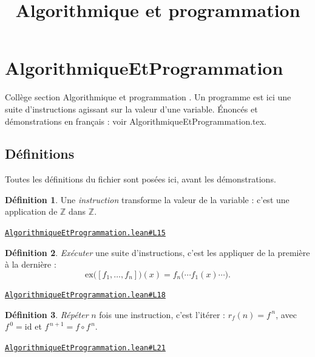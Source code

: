 \documentclass[11pt,a4paper]{article}
\title{Algorithmique et programmation}
\date{}
\theoremstyle{definition}
\newtheorem{definition}{Définition}
\theoremstyle{plain}
\newcommand{\source}[2]{\par\smallskip\noindent\hfill{\footnotesize\href{#1}{\texttt{#2}}}\par\smallskip}
\begin{document}
\maketitle
\sloppy

\section{AlgorithmiqueEtProgrammation}

\noindent
Collège \textemdash{} section \og{} Algorithmique et programmation \fg{}.
Un programme est ici une suite d'instructions agissant sur la valeur d'une variable.
Énoncés et démonstrations en français : voir AlgorithmiqueEtProgrammation.tex.

\subsection{Définitions}

\noindent
Toutes les définitions du fichier sont posées ici, avant les démonstrations.

\begin{definition}
Une \emph{instruction} transforme la valeur de la variable : c'est une
application de $\mathbb{Z}$ dans $\mathbb{Z}$.
\end{definition}
\source{https://github.com/Commutator-IO/learn-lean/blob/main/courses/01-college/07-algorithmique-et-programmation/AlgorithmiqueEtProgrammation.lean\#L15}{AlgorithmiqueEtProgrammation.lean\#L15}

\begin{definition}
\emph{Exécuter} une suite d'instructions, c'est les appliquer de la première à la
dernière :
\[ \mathrm{ex}\bigl([f_1, \dots, f_n]\bigr)(x) = f_n\bigl(\cdots f_1(x) \cdots\bigr) . \]
\end{definition}
\source{https://github.com/Commutator-IO/learn-lean/blob/main/courses/01-college/07-algorithmique-et-programmation/AlgorithmiqueEtProgrammation.lean\#L18}{AlgorithmiqueEtProgrammation.lean\#L18}

\begin{definition}
\emph{Répéter} $n$ fois une instruction, c'est l'itérer : $r_f(n) = f^{\,n}$, avec
$f^{\,0} = \mathrm{id}$ et $f^{\,n+1} = f \circ f^{\,n}$.
\end{definition}
\source{https://github.com/Commutator-IO/learn-lean/blob/main/courses/01-college/07-algorithmique-et-programmation/AlgorithmiqueEtProgrammation.lean\#L21}{AlgorithmiqueEtProgrammation.lean\#L21}
\end{document}
